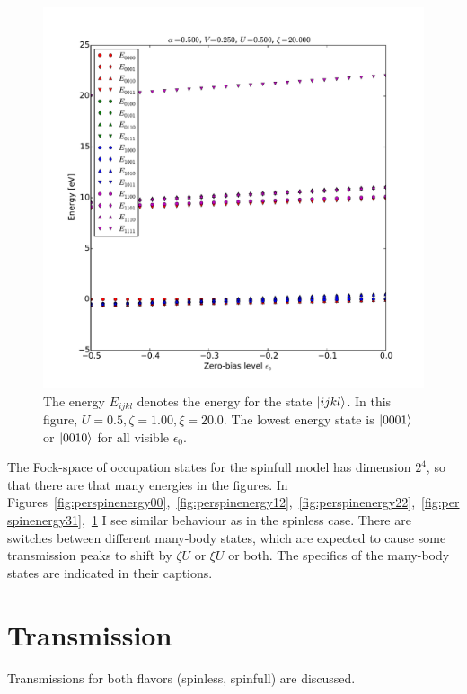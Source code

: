 \begin{figure}[h]
    \centering
    \includegraphics[height=.45\textheight]{pdf/energy/pespin_distribution_u3_k4.pdf}
    \caption{The energy $E_{ijkl}$ denotes the energy for the state $\ket{ijkl}$. In this figure, $U=0.5, \zeta=1.00, \xi=20.0$. The lowest energy state is $\ket{0001}$ or $\ket{0010}$ for all visible $\epsilon_0$.}
    \label{fig:perspinenergy34}
\end{figure}


The Fock-space of occupation states for the spinfull model has dimension $2^4$, so that there are that many energies in the figures. In Figures~\ref{fig:perspinenergy00},~\ref{fig:perspinenergy12},~\ref{fig:perspinenergy22},~\ref{fig:perspinenergy31},~\ref{fig:perspinenergy34} I see similar behaviour as in the spinless case. There are switches between different many-body states, which are expected to cause some transmission peaks to shift by $\zeta U$ or $\xi U$ or both. The specifics of the many-body states are indicated in their captions.
\section{Transmission}
\label{sec:twositetransmission}
Transmissions for both flavors (spinless, spinfull) are discussed. 
